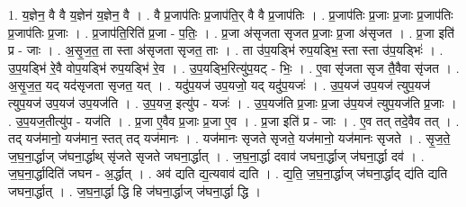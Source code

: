 \documentclass[17pt]{extarticle}
\begin{document}
1. य॒ज्ञेन॒ वै वै य॒ज्ञेन॑ य॒ज्ञेन॒ वै । . वै प्र॒जाप॑तिः प्र॒जाप॑ति॒र् वै वै प्र॒जाप॑तिः । . प्र॒जाप॑तिः प्र॒जाः प्र॒जाः प्र॒जाप॑तिः प्र॒जाप॑तिः प्र॒जाः । . प्र॒जाप॑ति॒रिति॑ प्र॒जा - प॒तिः॒ । . प्र॒जा अ॑सृजता सृजत प्र॒जाः प्र॒जा अ॑सृजत । . प्र॒जा इति॑ प्र - जाः । . अ॒सृ॒ज॒त॒ ता स्ता अ॑सृजता सृजत॒ ताः । . ता उ॑प॒यड्भि॑ रुप॒यड्भि॒ स्ता स्ता उ॑प॒यड्भिः॑ । . उ॒प॒यड्भि॑ रे॒वै वोप॒यड्भि॑ रुप॒यड्भि॑ रे॒व । . उ॒प॒यड्भि॒रित्यु॑प॒यट् - भिः॒ । . ए॒वा सृ॑जता सृज तै॒वैवा सृ॑जत । . अ॒सृ॒ज॒त॒ यद् यद॑सृजता सृजत॒ यत् । . यदु॑प॒यज॑ उप॒यजो॒ यद् यदु॑प॒यजः॑ । . उ॒प॒यज॑ उप॒यज॑ त्युप॒यज॑ त्युप॒यज॑ उप॒यज॑ उप॒यज॑ति । . उ॒प॒यज॒ इत्यु॑प - यजः॑ । . उ॒प॒यज॑ति प्र॒जाः प्र॒जा उ॑प॒यज॑ त्युप॒यज॑ति प्र॒जाः । . उ॒प॒यज॒तीत्यु॑प - यज॑ति । . प्र॒जा ए॒वैव प्र॒जाः प्र॒जा ए॒व । . प्र॒जा इति॑ प्र - जाः । . ए॒व तत् तदे॒वैव तत् । . तद् यज॑मानो॒ यज॑मान॒ स्तत् तद् यज॑मानः । . यज॑मानः सृजते सृजते॒ यज॑मानो॒ यज॑मानः सृजते । . सृ॒ज॒ते॒ ज॒घ॒ना॒र्द्धाज् ज॑घना॒र्द्धाथ् सृ॑जते सृजते जघना॒र्द्धात् । . ज॒घ॒ना॒र्द्धा दवाव॑ जघना॒र्द्धाज् ज॑घना॒र्द्धा दव॑ । . ज॒घ॒ना॒र्द्धादिति॑ जघन - अ॒र्द्धात् । . अव॑ द्यति द्य॒त्यवाव॑ द्यति । . द्य॒ति॒ ज॒घ॒ना॒र्द्धाज् ज॑घना॒र्द्धाद् द्य॑ति द्यति जघना॒र्द्धात् । . ज॒घ॒ना॒र्द्धा द्धि हि ज॑घना॒र्द्धाज् ज॑घना॒र्द्धा द्धि । \newline
\end{document}
